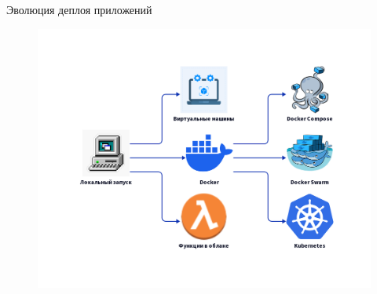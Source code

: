 \begin{frame}{ Эволюция деплоя приложений}

    \begin{figure}
        \centering
        \includegraphics[width=\paperheight]{images/docker.png}
        \label{fig:evolution}
    \end{figure}

\end{frame}



